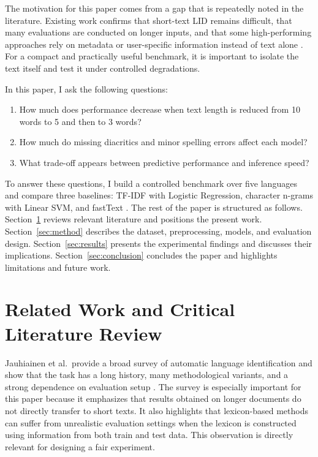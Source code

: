 \documentclass[conference]{IEEEtran}
\begin{document}
The motivation for this paper comes from a gap that is repeatedly noted in the literature. Existing work confirms that short-text LID remains difficult, that many evaluations are conducted on longer inputs, and that some high-performing approaches rely on metadata or user-specific information instead of text alone \cite{jauhiainen2019survey,balazevic2016shortsocial,duvenhage2019short}. For a compact and practically useful benchmark, it is important to isolate the text itself and test it under controlled degradations.

In this paper, I ask the following questions:

\begin{enumerate}
    \item How much does performance decrease when text length is reduced from 10 words to 5 and then to 3 words?
    \item How much do missing diacritics and minor spelling errors affect each model?
    \item What trade-off appears between predictive performance and inference speed?
\end{enumerate}

To answer these questions, I build a controlled benchmark over five languages and compare three baselines: TF-IDF with Logistic Regression, character n-grams with Linear SVM, and fastText \cite{joulin2017fasttext}. The rest of the paper is structured as follows. Section~\ref{sec:related} reviews relevant literature and positions the present work. Section~\ref{sec:method} describes the dataset, preprocessing, models, and evaluation design. Section~\ref{sec:results} presents the experimental findings and discusses their implications. Section~\ref{sec:conclusion} concludes the paper and highlights limitations and future work.

\section{Related Work and Critical Literature Review}
\label{sec:related}

Jauhiainen et al.\ provide a broad survey of automatic language identification and show that the task has a long history, many methodological variants, and a strong dependence on evaluation setup \cite{jauhiainen2019survey}. The survey is especially important for this paper because it emphasizes that results obtained on longer documents do not directly transfer to short texts. It also highlights that lexicon-based methods can suffer from unrealistic evaluation settings when the lexicon is constructed using information from both train and test data. This observation is directly relevant for designing a fair experiment.
\end{document}
